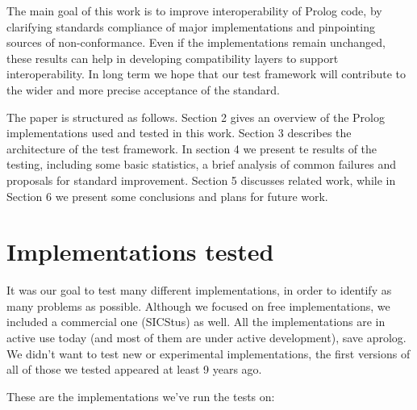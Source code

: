 \documentclass[draft]{llncs}%
\begin{document}

The main goal of this work is to improve interoperability of Prolog code, by
clarifying standards compliance of major implementations and pinpointing
sources of non-conformance. Even if the implementations remain unchanged,
these results can help in developing compatibility layers to support
interoperability. In long term we hope that our test framework will
contribute to the wider and more precise acceptance of the standard.

The paper is structured as follows. Section 2 gives an overview of the
Prolog implementations used and tested in this work. Section 3 describes the
architecture of the test framework. In section 4 we present te results of the
testing, including some basic statistics, a brief analysis of common failures
and proposals for standard improvement. Section 5 discusses related work,
while in Section 6 we present some conclusions and plans for future work.


\section{Implementations tested}

It was our goal to test many different implementations, in order to identify
as many problems as possible. Although we focused on free implementations, we
included a commercial one (SICStus) as well. All the implementations are in
active use today (and most of them are under active development), save
aprolog. We didn't want to test new or experimental implementations, the
first versions of all of those we tested appeared at least 9 years ago. 

These are the implementations we've run the tests on:
\end{document}
